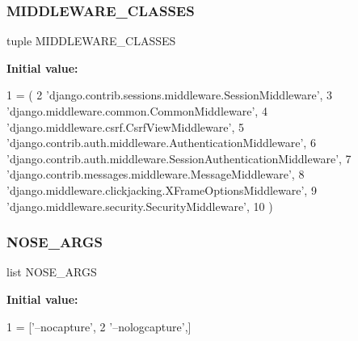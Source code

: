 \mbox{\label{namespacedynamicfiltersite_1_1settings_a625748b6f9b2b18184a1f5447b74d728}} 
\subsubsection{\texorpdfstring{M\+I\+D\+D\+L\+E\+W\+A\+R\+E\+\_\+\+C\+L\+A\+S\+S\+ES}{MIDDLEWARE\_CLASSES}}
{\footnotesize\ttfamily tuple M\+I\+D\+D\+L\+E\+W\+A\+R\+E\+\_\+\+C\+L\+A\+S\+S\+ES}

{\bfseries Initial value\+:}
\begin{DoxyCode}
1 =  (
2     \textcolor{stringliteral}{'django.contrib.sessions.middleware.SessionMiddleware'},
3     \textcolor{stringliteral}{'django.middleware.common.CommonMiddleware'},
4     \textcolor{stringliteral}{'django.middleware.csrf.CsrfViewMiddleware'},
5     \textcolor{stringliteral}{'django.contrib.auth.middleware.AuthenticationMiddleware'},
6     \textcolor{stringliteral}{'django.contrib.auth.middleware.SessionAuthenticationMiddleware'},
7     \textcolor{stringliteral}{'django.contrib.messages.middleware.MessageMiddleware'},
8     \textcolor{stringliteral}{'django.middleware.clickjacking.XFrameOptionsMiddleware'},
9     \textcolor{stringliteral}{'django.middleware.security.SecurityMiddleware'},
10 )
\end{DoxyCode}
\mbox{\label{namespacedynamicfiltersite_1_1settings_a4b4f0b801c1d1b0fee67c8f45391ffb1}} 
\subsubsection{\texorpdfstring{N\+O\+S\+E\+\_\+\+A\+R\+GS}{NOSE\_ARGS}}
{\footnotesize\ttfamily list N\+O\+S\+E\+\_\+\+A\+R\+GS}

{\bfseries Initial value\+:}
\begin{DoxyCode}
1 =  [\textcolor{stringliteral}{'--nocapture'},
2              \textcolor{stringliteral}{'--nologcapture'},]
\end{DoxyCode}
\mbox{\label{namespacedynamicfiltersite_1_1settings_aeea25bc27cd24a96741399e2068f3531}} 
